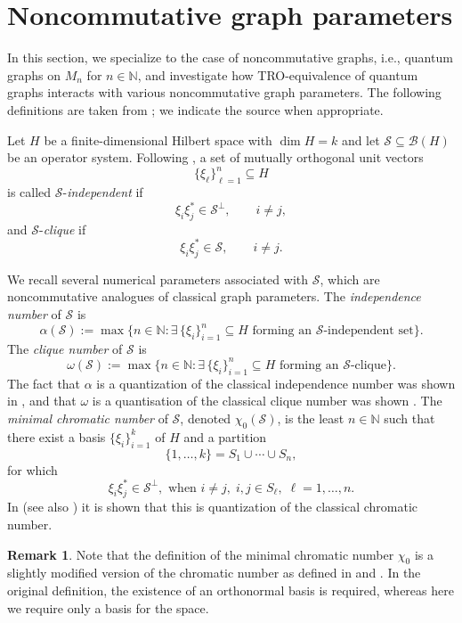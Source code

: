 \documentclass[11pt]{amsart}
\numberwithin{equation}{section}
\theoremstyle{plain}
\theoremstyle{definition}
\newtheorem{remark}[theorem]{Remark}
\theoremstyle{remark}
\newcommand{\B}{{\mathcal{B}}}
\renewcommand{\S}{{\mathcal{S}}}
\def\al{\alpha}
\newcommand{\bN}{\mathbb{N}}
\begin{document}
\section{Noncommutative graph parameters} \label{sec:nonc}
In this section, we specialize to the case of noncommutative graphs, i.e., quantum graphs on $M_n$ for $ n \in \bN$, and investigate how TRO-equivalence of quantum graphs interacts with various noncommutative graph parameters. The following definitions are taken from \cite{BTW21,DSW13,Pau}; we indicate the source when appropriate.

Let $H$ be a finite-dimensional Hilbert space with $\dim H=k$ and let $\S\subseteq\B(H)$ be an operator system. Following \cite{BTW21,DSW13}, a set of mutually orthogonal unit vectors
\[
\{\xi_{\ell}\}_{\ell=1}^{n} \subseteq H
\]
is called $\S$-\emph{independent} if
\[
\xi_i\xi_j^* \in \S^\perp, 
\qquad i\neq j,
\]
and  $\S$-\emph{clique} if 
\[
\xi_i\xi_j^* \in \S, 
\qquad i\neq j.
\]

We recall several numerical parameters associated with $\S$, which are noncommutative analogues of classical graph parameters.
The \emph{independence number} of $\S$ is
\[
\alpha(\S)
:=
\max\Big\{
n\in\mathbb{N} :
\exists\, \{\xi_i\}_{i=1}^{n} \subseteq H
\text{ forming an $\S$-independent set}
\Big\}.
\]
The \emph{clique number} of $\S$ is
\[
\omega(\S)
:=
\max\Big\{
n\in\mathbb{N} :
\exists\, \{\xi_i\}_{i=1}^{n} \subseteq H
\text{ forming an $\S$-clique}
\Big\}.
\]
The fact that $\al$ is a quantization of the classical independence number was shown in \cite{DSW13}, and that $\omega$ is a quantisation of the classical clique number was shown \cite[Corollary 3.9]{BTW21}.
The \emph{minimal chromatic number} of $\S$, denoted $\chi_{0}(\S)$, is the least $n\in\mathbb{N}$ such that there exist
a basis $\{\xi_{i}\}_{i=1}^{k}$ of $H$ and a partition
\[
\{1,\dots,k\}=S_{1}\cup\cdots\cup S_{n},
\]
for which
\[
\xi_i\xi_j^* \in \S^\perp,
\text{ when }
i\neq j,\; i,j\in S_{\ell},\; \ell=1,\dots,n .
\]
In \cite[Theorem 14]{KM19} (see also \cite{Pau}) it is shown that this is quantization of the classical chromatic number.

\begin{remark}
Note that the definition of the minimal chromatic number $\chi_0$ is a slightly modified version of the chromatic number as defined in  \cite{KM19} and \cite{Pau}. In the original definition, the existence of an orthonormal basis is required, whereas here we require only a basis for the space. 
\end{remark}
\end{document}
